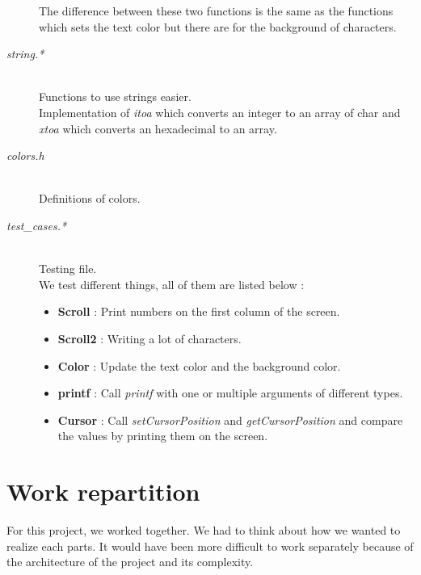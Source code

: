 \documentclass[a4paper]{article}
\begin{document}
\begin{description}
The difference between these two functions is the same as the functions which sets the text color but there are for the background of characters.

\item[\textit{string.*}] \hfill \\
Functions to use strings easier. \\
Implementation of \textit{itoa} which converts an integer to an array of char and \textit{xtoa} which converts an hexadecimal to an array.

\item[\textit{colors.h}] \hfill \\
Definitions of colors.

\item[\textit{test\_cases.*}] \hfill \\
Testing file.\\
We test different things, all of them are listed below :
\begin{itemize}
\item \textbf{Scroll} : Print numbers on the first column of the screen.
\item \textbf{Scroll2} : Writing a lot of characters.
\item \textbf{Color} : Update the text color and the background color.
\item \textbf{printf} : Call \textit{printf} with one or multiple arguments of different types.
\item \textbf{Cursor} : Call \textit{setCursorPosition} and \textit{getCursorPosition} and compare the values by printing them on the screen.
\end{itemize}

\end{description}

\section{Work repartition}
For this project, we worked together. We had to think about how we wanted to realize each parts. It would have been more difficult to work separately because of the architecture of the project and its complexity.
\end{document}
